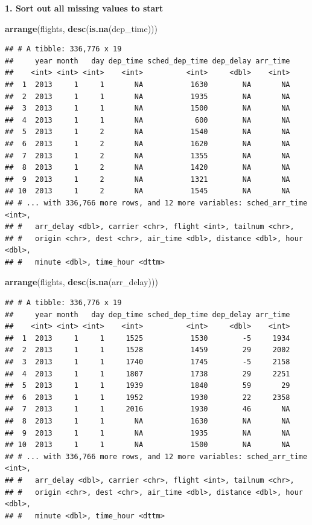 \documentclass[]{book}
\newenvironment{Shaded}{\begin{snugshade}}{\end{snugshade}}
\newcommand{\KeywordTok}[1]{\textcolor[rgb]{0.13,0.29,0.53}{\textbf{#1}}}
\newcommand{\NormalTok}[1]{#1}
\theoremstyle{definition}
\theoremstyle{definition}
\theoremstyle{definition}
\theoremstyle{remark}
\begin{document}
\textbf{1. Sort out all missing values to start}

\begin{Shaded}
\begin{Highlighting}[]
\KeywordTok{arrange}\NormalTok{(flights, }\KeywordTok{desc}\NormalTok{(}\KeywordTok{is.na}\NormalTok{(dep_time)))}
\end{Highlighting}
\end{Shaded}

\begin{verbatim}
## # A tibble: 336,776 x 19
##     year month   day dep_time sched_dep_time dep_delay arr_time
##    <int> <int> <int>    <int>          <int>     <dbl>    <int>
##  1  2013     1     1       NA           1630        NA       NA
##  2  2013     1     1       NA           1935        NA       NA
##  3  2013     1     1       NA           1500        NA       NA
##  4  2013     1     1       NA            600        NA       NA
##  5  2013     1     2       NA           1540        NA       NA
##  6  2013     1     2       NA           1620        NA       NA
##  7  2013     1     2       NA           1355        NA       NA
##  8  2013     1     2       NA           1420        NA       NA
##  9  2013     1     2       NA           1321        NA       NA
## 10  2013     1     2       NA           1545        NA       NA
## # ... with 336,766 more rows, and 12 more variables: sched_arr_time <int>,
## #   arr_delay <dbl>, carrier <chr>, flight <int>, tailnum <chr>,
## #   origin <chr>, dest <chr>, air_time <dbl>, distance <dbl>, hour <dbl>,
## #   minute <dbl>, time_hour <dttm>
\end{verbatim}

\begin{Shaded}
\begin{Highlighting}[]
\KeywordTok{arrange}\NormalTok{(flights, }\KeywordTok{desc}\NormalTok{(}\KeywordTok{is.na}\NormalTok{(arr_delay)))}
\end{Highlighting}
\end{Shaded}

\begin{verbatim}
## # A tibble: 336,776 x 19
##     year month   day dep_time sched_dep_time dep_delay arr_time
##    <int> <int> <int>    <int>          <int>     <dbl>    <int>
##  1  2013     1     1     1525           1530        -5     1934
##  2  2013     1     1     1528           1459        29     2002
##  3  2013     1     1     1740           1745        -5     2158
##  4  2013     1     1     1807           1738        29     2251
##  5  2013     1     1     1939           1840        59       29
##  6  2013     1     1     1952           1930        22     2358
##  7  2013     1     1     2016           1930        46       NA
##  8  2013     1     1       NA           1630        NA       NA
##  9  2013     1     1       NA           1935        NA       NA
## 10  2013     1     1       NA           1500        NA       NA
## # ... with 336,766 more rows, and 12 more variables: sched_arr_time <int>,
## #   arr_delay <dbl>, carrier <chr>, flight <int>, tailnum <chr>,
## #   origin <chr>, dest <chr>, air_time <dbl>, distance <dbl>, hour <dbl>,
## #   minute <dbl>, time_hour <dttm>
\end{verbatim}
\end{document}
